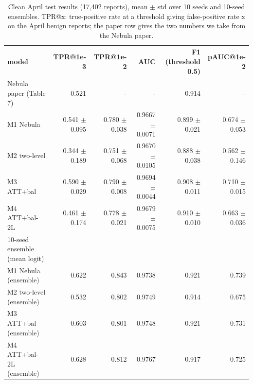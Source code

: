 \begin{table}[t]
\centering
\small
\caption{Clean April test results (17,402 reports), mean $\pm$ std over 10 seeds and 10-seed ensembles. TPR@x: true-positive rate at a threshold giving false-positive rate x on the April benign reports; the paper row gives the two numbers we take from the Nebula paper.}
\label{tab:T4_clean_results}
\begin{tabular}{lrrrrr}
\toprule
model & TPR@1e-3 & TPR@1e-2 & AUC & F1 (threshold 0.5) & pAUC@1e-2 \\
\midrule
Nebula paper (Table 7) & 0.521 & - & - & 0.914 & - \\
M1 Nebula & 0.541 $\pm$ 0.095 & 0.780 $\pm$ 0.038 & 0.9667 $\pm$ 0.0071 & 0.899 $\pm$ 0.021 & 0.674 $\pm$ 0.053 \\
M2 two-level & 0.344 $\pm$ 0.189 & 0.751 $\pm$ 0.068 & 0.9670 $\pm$ 0.0105 & 0.888 $\pm$ 0.038 & 0.562 $\pm$ 0.146 \\
M3 ATT+bal & 0.590 $\pm$ 0.029 & 0.790 $\pm$ 0.008 & 0.9694 $\pm$ 0.0044 & 0.908 $\pm$ 0.011 & 0.710 $\pm$ 0.015 \\
M4 ATT+bal-2L & 0.461 $\pm$ 0.174 & 0.778 $\pm$ 0.021 & 0.9679 $\pm$ 0.0075 & 0.910 $\pm$ 0.010 & 0.663 $\pm$ 0.036 \\
10-seed ensemble (mean logit) &  &  &  &  &  \\
M1 Nebula (ensemble) & 0.622 & 0.843 & 0.9738 & 0.921 & 0.739 \\
M2 two-level (ensemble) & 0.532 & 0.802 & 0.9749 & 0.914 & 0.675 \\
M3 ATT+bal (ensemble) & 0.603 & 0.801 & 0.9748 & 0.921 & 0.731 \\
M4 ATT+bal-2L (ensemble) & 0.628 & 0.812 & 0.9767 & 0.917 & 0.725 \\
\bottomrule
\end{tabular}
\end{table}
